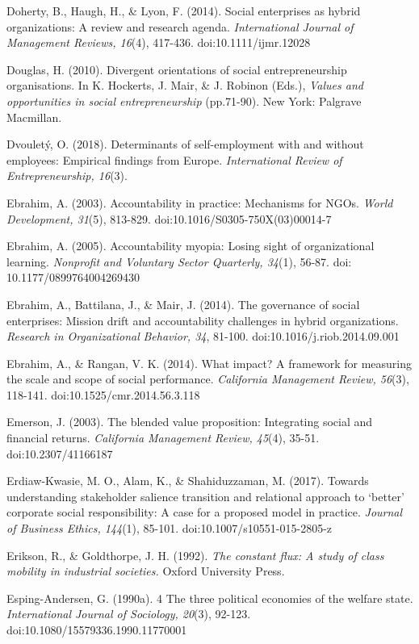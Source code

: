 \documentclass{article}
\begin{document}
Doherty, B., Haugh, H., \& Lyon, F. (2014). Social enterprises as hybrid organizations: A review and research agenda. \emph{International Journal of Management Reviews, 16}(4), 417-436. doi:10.1111/ijmr.12028

Douglas, H. (2010). Divergent orientations of social entrepreneurship organisations. In K. Hockerts, J. Mair, \& J. Robinon (Eds.), \emph{Values and opportunities in social entrepreneurship} (pp.71-90). New York: Palgrave Macmillan.

Dvouletý, O. (2018). Determinants of self-employment with and without employees: Empirical findings from Europe. \emph{International Review of Entrepreneurship, 16}(3). 

Ebrahim, A. (2003). Accountability in practice: Mechanisms for NGOs. \emph{World Development, 31}(5), 813-829. doi:10.1016/S0305-750X(03)00014-7

Ebrahim, A. (2005). Accountability myopia: Losing sight of organizational learning. \emph{Nonprofit}\emph{ and Voluntary Sector Quarterly, 34}(1), 56-87. doi: 10.1177/0899764004269430

Ebrahim, A., Battilana, J., \& Mair, J. (2014). The governance of social enterprises: Mission drift and accountability challenges in hybrid organizations. \emph{Research in Organizational }\emph{Behavior}\emph{, 34}, 81-100. doi:10.1016/j.riob.2014.09.001

Ebrahim, A., \& Rangan, V. K. (2014). What impact? A framework for measuring the scale and scope of social performance. \emph{California Management Review, 56}(3), 118-141. doi:10.1525/cmr.2014.56.3.118

Emerson, J. (2003). The blended value proposition: Integrating social and financial returns. \emph{California Management Review, 45}(4), 35-51. doi:10.2307/41166187

Erdiaw-Kwasie, M. O., Alam, K., \& Shahiduzzaman, M. (2017). Towards understanding stakeholder salience transition and relational approach to ‘better' corporate social responsibility: A case for a proposed model in practice. \emph{Journal of Business Ethics, 144}(1), 85-101. doi:10.1007/s10551-015-2805-z

Erikson, R., \& Goldthorpe, J. H. (1992). \emph{The constant flux: A study of class mobility in industrial societies.} Oxford University Press.

Esping-Andersen, G. (1990a). 4 The three political economies of the welfare state. \emph{International Journal of Sociology, 20}(3), 92-123. doi:10.1080/15579336.1990.11770001
\end{document}
